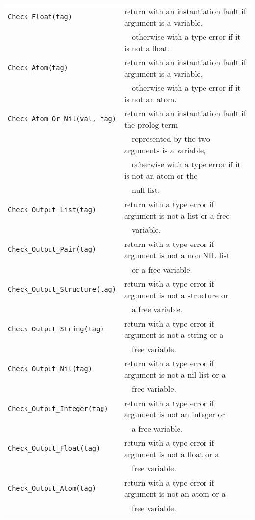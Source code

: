 \begin{tabular}{|ll|}
{\tt Check_Float(tag)} & 
return with an instantiation fault if argument is a variable, \\
& \ \ otherwise with a type error if it is not a float. \\

{\tt Check_Atom(tag)} & 
return with an instantiation fault if argument is a variable, \\
& \ \ otherwise with a type error if it is not an atom. \\

{\tt Check_Atom_Or_Nil(val, tag)} & 
return with an instantiation fault if the prolog term \\
& \ \ represented by the two arguments is a variable, \\
& \ \ otherwise with a type error if it is not an atom or the \\
& \ \ null list. \\

{\tt Check_Output_List(tag)} & 
return with a type error if argument is not a list or a free \\
& \ \ variable. \\

{\tt Check_Output_Pair(tag)} & 
return with a type error if argument is not a non NIL list \\
& \ \ or a free variable. \\

{\tt Check_Output_Structure(tag)} & 
return with a type error if argument is not a structure or \\
& \ \ a free variable. \\

{\tt Check_Output_String(tag)} & 
return with a type error if argument is not a string or a \\
& \ \ free variable. \\

{\tt Check_Output_Nil(tag)} & 
return with a type error if argument is not a nil list or a \\
& \ \ free variable. \\

{\tt Check_Output_Integer(tag)} & 
return with a type error if argument is not an integer or \\
& \ \ a free variable. \\

{\tt Check_Output_Float(tag)} & 
return with a type error if argument is not a float or a \\
& \ \ free variable. \\

{\tt Check_Output_Atom(tag)} & 
return with a type error if argument is not an atom or a \\
& \ \ free variable. \\
\hline
\end{tabular}

